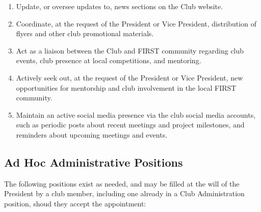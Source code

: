 \documentclass[english,11pt]{article}
\begin{document}
\begin{enumerate}[label=\Alph*.]
    \item Update, or oversee updates to, news sections on the Club website.
    \item Coordinate, at the request of the President or Vice President, distribution of flyers and other club promotional materials.
    \item Act as a liaison between the Club and FIRST community regarding club events, club presence at local competitions, and mentoring.
    \item Actively seek out, at the request of the President or Vice President, new opportunities for mentorship and club involvement in the local FIRST community.
    \item Maintain an active social media presence via the club social media accounts, such as periodic posts about recent meetings and project milestones, and reminders about upcoming meetings and events.
\end{enumerate}

\subsection{Ad Hoc Administrative Positions} \label{sect:cadmin:adhoc}
The following positions exist as needed, and may be filled at the will of the President by a club member, including one already in a Club Administration position, shoud they accept the appointment:
\end{document}
